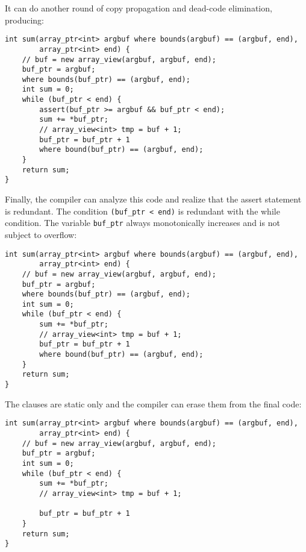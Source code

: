 It can do another round of copy propagation and dead-code elimination,
producing:

\begin{verbatim}
int sum(array_ptr<int> argbuf where bounds(argbuf) == (argbuf, end), 
        array_ptr<int> end) {
    // buf = new array_view(argbuf, argbuf, end);
    buf_ptr = argbuf;
    where bounds(buf_ptr) == (argbuf, end);
    int sum = 0;
    while (buf_ptr < end) {
        assert(buf_ptr >= argbuf && buf_ptr < end);
        sum += *buf_ptr;
        // array_view<int> tmp = buf + 1;
        buf_ptr = buf_ptr + 1
        where bound(buf_ptr) == (argbuf, end);
    }
    return sum;
}
\end{verbatim}

Finally, the compiler can analyze this code and realize that the assert
statement is redundant. The condition \texttt{(buf\_ptr \textless{}
end)} is redundant with the while condition. The variable
\texttt{buf\_ptr} always monotonically increases and is not subject to
overflow:
\begin{verbatim}
int sum(array_ptr<int> argbuf where bounds(argbuf) == (argbuf, end), 
        array_ptr<int> end) {
    // buf = new array_view(argbuf, argbuf, end);
    buf_ptr = argbuf;
    where bounds(buf_ptr) == (argbuf, end);
    int sum = 0;
    while (buf_ptr < end) {
        sum += *buf_ptr;
        // array_view<int> tmp = buf + 1;
        buf_ptr = buf_ptr + 1
        where bound(buf_ptr) == (argbuf, end);
    }
    return sum;
}
\end{verbatim}

The  clauses are static only and the compiler can erase
them from the final code:

\begin{verbatim}
int sum(array_ptr<int> argbuf where bounds(argbuf) == (argbuf, end), 
        array_ptr<int> end) {
    // buf = new array_view(argbuf, argbuf, end);
    buf_ptr = argbuf;
    int sum = 0;
    while (buf_ptr < end) {
        sum += *buf_ptr;
        // array_view<int> tmp = buf + 1;

        buf_ptr = buf_ptr + 1
    }
    return sum;
}
\end{verbatim}